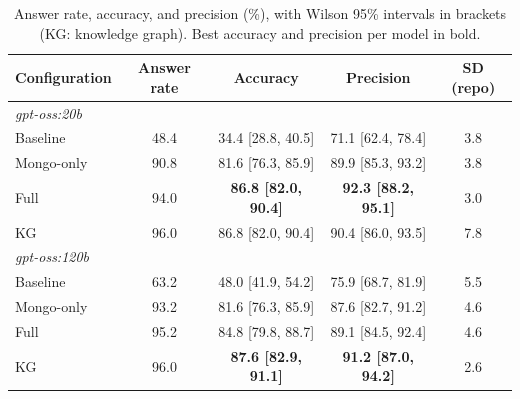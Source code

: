 \begin{table}[t]
\centering
\footnotesize
\setlength{\tabcolsep}{2pt}
\caption{Answer rate, accuracy, and precision (\%), with Wilson 95\% intervals in brackets (KG: knowledge graph). Best accuracy and precision per model in bold.}
\label{tab:accuracy-results}
\begin{tabular}{lcccc}
\toprule
\textbf{Configuration} & \textbf{Answer rate} & \textbf{Accuracy} & \textbf{Precision} & \textbf{SD (repo)} \\
\midrule
\multicolumn{5}{l}{\textit{gpt-oss:20b}} \\
Baseline   & 48.4  & 34.4 [28.8, 40.5] & 71.1 [62.4, 78.4] & 3.8 \\
Mongo-only   & 90.8  & 81.6 [76.3, 85.9] & 89.9 [85.3, 93.2] & 3.8 \\
Full   & 94.0  & \textbf{86.8 [82.0, 90.4]} & \textbf{92.3 [88.2, 95.1]} & 3.0 \\
KG   & 96.0  & 86.8 [82.0, 90.4] & 90.4 [86.0, 93.5] & 7.8 \\
\midrule
\multicolumn{5}{l}{\textit{gpt-oss:120b}} \\
Baseline   & 63.2  & 48.0 [41.9, 54.2] & 75.9 [68.7, 81.9] & 5.5 \\
Mongo-only   & 93.2  & 81.6 [76.3, 85.9] & 87.6 [82.7, 91.2] & 4.6 \\
Full   & 95.2  & 84.8 [79.8, 88.7] & 89.1 [84.5, 92.4] & 4.6 \\
KG   & 96.0  & \textbf{87.6 [82.9, 91.1]} & \textbf{91.2 [87.0, 94.2]} & 2.6 \\
\bottomrule
\end{tabular}
\end{table}
